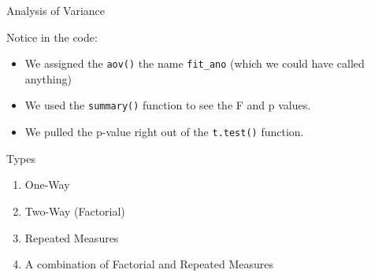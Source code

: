 \begin{frame}[fragile]{Analysis of Variance}

\begin{Shaded}
\begin{Highlighting}[]
\StringTok{ }\OperatorTok{$}\OperatorTok{~}\StringTok{ }\OperatorTok{$}
\OperatorTok{$}\OperatorTok{~}\StringTok{ }\OperatorTok{$}\OperatorTok{$}
\end{Highlighting}
\end{Shaded}

Notice in the code:

\begin{itemize}
\tightlist
\item
  We assigned the \texttt{aov()} the name \texttt{fit\_ano} (which we
  could have called anything)
\item
  We used the \texttt{summary()} function to see the F and p values.
\item
  We pulled the p-value right out of the \texttt{t.test()} function.
\end{itemize}

\end{frame}

\begin{frame}{Types}

\huge

\begin{enumerate}
\item One-Way
\item Two-Way (Factorial)
\item Repeated Measures
\item A combination of Factorial and Repeated Measures
\end{enumerate}

\end{frame}

